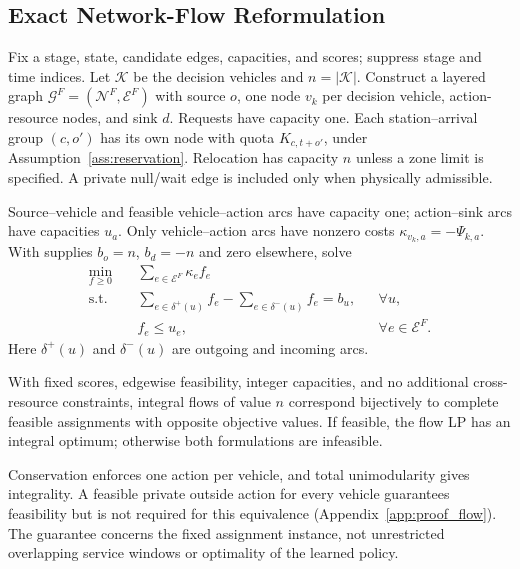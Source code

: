 \subsection{Exact Network-Flow Reformulation}
\label{sec:flow_reformulation}
Fix a stage, state, candidate edges, capacities, and scores; suppress
stage and time indices. Let $\mathcal K$ be the decision vehicles and
$n=|\mathcal K|$. Construct a layered graph
$\mathcal G^F=(\mathcal N^F,\mathcal E^F)$ with source $o$, one node
$v_k$ per decision vehicle, action-resource nodes, and sink $d$.
Requests have capacity one. Each station--arrival group $(c,o')$ has
its own node with quota $K_{c,t+o'}$, under
Assumption~\ref{ass:reservation}. Relocation has capacity $n$ unless
a zone limit is specified. A private null/wait edge is included only
when physically admissible.

Source--vehicle and feasible vehicle--action arcs have capacity one;
action--sink arcs have capacities $u_a$. Only vehicle--action arcs have
nonzero costs $\kappa_{v_k,a}=-\Psi_{k,a}$. With supplies $b_o=n$,
$b_d=-n$ and zero elsewhere, solve
\begin{align}
\min_{f\ge0}\quad&\sum_{e\in\mathcal E^F}\kappa_e f_e
\label{eq:flow_objective}\\
\text{s.t.}\quad&\sum_{e\in\delta^+(u)}f_e
-\sum_{e\in\delta^-(u)}f_e=b_u,
&&\forall u,\label{eq:flow_balance}\\
&f_e\le u_e,&&\forall e\in\mathcal E^F.
\label{eq:flow_capacity}
\end{align}
Here $\delta^+(u)$ and $\delta^-(u)$ are outgoing and incoming arcs.

\begin{thm}
\label{thm:ilp-mcf}
With fixed scores, edgewise feasibility, integer capacities, and no
additional cross-resource constraints, integral flows of value $n$
correspond bijectively to complete feasible assignments with opposite
objective values. If feasible, the flow LP has an integral optimum;
otherwise both formulations are infeasible.
\end{thm}

Conservation enforces one action per vehicle, and total unimodularity
gives integrality. A feasible private outside action for every vehicle
guarantees feasibility but is not required for this equivalence
(Appendix~\ref{app:proof_flow}). The guarantee concerns the fixed
assignment instance, not unrestricted overlapping service windows or
optimality of the learned policy.

